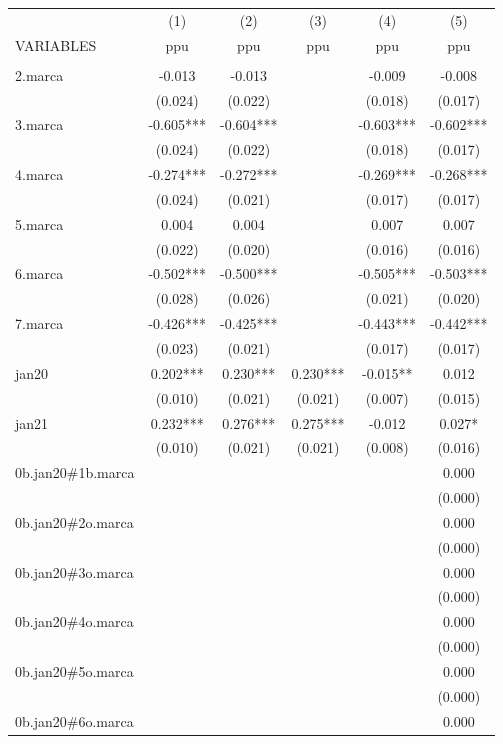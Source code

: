 \begin{tabular}{lccccc} \hline
 & (1) & (2) & (3) & (4) & (5) \\
VARIABLES & ppu & ppu & ppu & ppu & ppu \\ \hline
 &  &  &  &  &  \\
2.marca & -0.013 & -0.013 &  & -0.009 & -0.008 \\
 & (0.024) & (0.022) &  & (0.018) & (0.017) \\
3.marca & -0.605*** & -0.604*** &  & -0.603*** & -0.602*** \\
 & (0.024) & (0.022) &  & (0.018) & (0.017) \\
4.marca & -0.274*** & -0.272*** &  & -0.269*** & -0.268*** \\
 & (0.024) & (0.021) &  & (0.017) & (0.017) \\
5.marca & 0.004 & 0.004 &  & 0.007 & 0.007 \\
 & (0.022) & (0.020) &  & (0.016) & (0.016) \\
6.marca & -0.502*** & -0.500*** &  & -0.505*** & -0.503*** \\
 & (0.028) & (0.026) &  & (0.021) & (0.020) \\
7.marca & -0.426*** & -0.425*** &  & -0.443*** & -0.442*** \\
 & (0.023) & (0.021) &  & (0.017) & (0.017) \\
jan20 & 0.202*** & 0.230*** & 0.230*** & -0.015** & 0.012 \\
 & (0.010) & (0.021) & (0.021) & (0.007) & (0.015) \\
jan21 & 0.232*** & 0.276*** & 0.275*** & -0.012 & 0.027* \\
 & (0.010) & (0.021) & (0.021) & (0.008) & (0.016) \\
0b.jan20\#1b.marca &  &  &  &  & 0.000 \\
 &  &  &  &  & (0.000) \\
0b.jan20\#2o.marca &  &  &  &  & 0.000 \\
 &  &  &  &  & (0.000) \\
0b.jan20\#3o.marca &  &  &  &  & 0.000 \\
 &  &  &  &  & (0.000) \\
0b.jan20\#4o.marca &  &  &  &  & 0.000 \\
 &  &  &  &  & (0.000) \\
0b.jan20\#5o.marca &  &  &  &  & 0.000 \\
 &  &  &  &  & (0.000) \\
0b.jan20\#6o.marca &  &  &  &  & 0.000 \\

\end{tabular}

